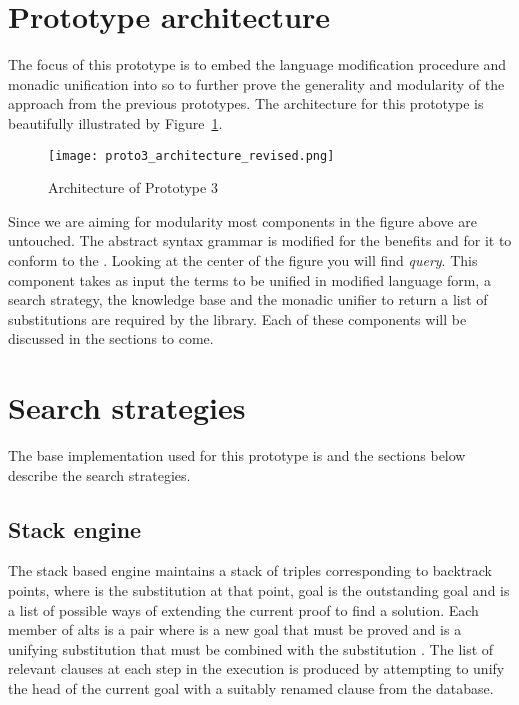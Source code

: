 \documentclass[thesis-solanki.tex]{files}
\begin{document}
\section{Prototype architecture}

The focus of this prototype is to embed the language modification procedure and monadic unification into \cite{website:mini-prolog-hugs98} so to further 
prove the generality and modularity of the approach from the previous prototypes. 
The architecture for this prototype is beautifully illustrated by Figure~\ref{fig:architecture-proto-3}. 

\begin{figure}[H]
  \texttt{[image: proto3\_architecture\_revised.png]}
\vspace*{-1cm}
  \caption{Architecture of Prototype 3}
  \label{fig:architecture-proto-3}
\end{figure}

Since we are aiming for modularity most components in the figure above are untouched. The abstract syntax grammar is modified for the benefits and for it
to conform to the  \cite{unification-fd-lib}.
Looking at the center of the figure you will find \textit{query}. This component takes as input the terms to be unified in modified language form, a 
search strategy, the knowledge base and the monadic unifier to return a list of substitutions are required by the library. Each of these components will be
discussed in the sections to come.   


\section{Search strategies}
The base implementation used for this prototype is \cite{website:mini-prolog-hugs98} and the sections below describe the search
strategies.

\subsection{Stack engine}
The stack based engine maintains a stack of triples 
corresponding to backtrack points, where  is the substitution at that
point, goal is the outstanding goal and  is a list of possible ways
of extending the current proof to find a solution.  Each member of alts
is a pair  where  is a new goal that must be proved and  is
a unifying substitution that must be combined with the substitution .
The list of relevant clauses at each step in the execution is produced
by attempting to unify the head of the current goal with a suitably
renamed clause from the database.
\end{document}
